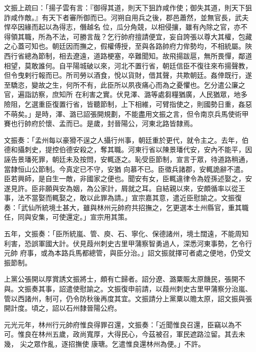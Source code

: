 \begin{pinyinscope}
 文振上疏曰：「揚子雲有言：『御得其道，則天下狙詐咸作使；御失其道，則天下狙詐咸作敵。』有天下者審所御而已。河朔自用兵之後，郡邑蕭然，並無官長，武夫悍卒因緣而起以為得志，僭越名
 位，瓜分角競，以相侵攘，雖有內除之官，亦不得領其職，所為不法，可勝言哉？乞行帥府擅請便宜，妄自誇張以尊大其權，包藏之心蓋可知也。朝廷因而撫之，假權傅授，至與各路帥府力侔勢均，不相統屬。陜西行省總為節制，相去遼遠，道路梗塞，卒難聞知。故飛揚跋扈，無所畏憚，鄰道相望，莫敢誰何。自平陽城破以來，河北不置行省，朝廷信臣不復往來布揚聲教，但令曳剌行報而已。所司勞以酒食，悅以貨財，借其聲，共欺朝廷。姦倖既行，遂至驕恣，變故之生，何所不有，此臣所以夙夜痛心而為之憂懼也。乞分遣公廉之官，遍詣訪察，庶知所
 在利害之實。伏見澤、潞等處芻糧猶廣，人民猶眾，地多險阻，乞選重臣復置行省，皆聽節制，上下相維，可臂指使之，則國勢日重，姦惡不萌矣。」是時，澤、潞已詔張開規劃，不能盡用文振之言，但令南京兵馬使術甲賽也行帥府於懷、孟而已。是歲，封晉陽公，河東北路皆隸焉。



 文振奏：「孟州每以豪猾不逞之人攝行州事，朝廷重於更代，就令主之。去年，伯德和攝刺史，提控伯德安殺之，奪其職。河東行省以陳景璠代安，安內不能平，因誣告景璠死罪，朝廷未及按問，安輒逐之。恥受臣節制，宣言于眾，待道路稍通，當隸恒山公節制。今真定已不守，安猶
 向慕不已。臣徵兵諸郡，安輒詭辭不遣。臣若興師，是自生一敵，非國家之便也。聞安有女，臣輒違律令為姪孫述娶之，安遂見許。臣非願與安為姻，為公家計，屑就之耳。自結親以來，安頗循率以從王事，法不當娶而輒娶之，敢以此罪為請。」宣宗嘉其意，遣近臣慰諭之。文振復奏：「武仙所統境土甚大，雖與林州元帥府共招撫之，乞更選本土州縣官，重其職任，同與安集，可使還定。」宣宗用其策。



 五年，文振奏：「臣所統嵐、管、庾、石、寧化、保德諸州，境土闊遠，不能周知利害，恐誤軍國大計。伏見葭州刺史古里甲蒲察智勇過人，深悉河東事勢，乞令行元帥
 府事，或為本路兵馬都總管，與臣分治。」詔文振就擇可者處之便地，仍受文振節制。



 上黨公張開以厚賞誘文振將士，頗有亡歸者。詔分遼、潞粟賑太原饑民，張開不與。文振奏其事，詔遣使慰諭之。文振復申前請，以葭州刺史古里甲蒲察分治嵐、管以西諸州，制可，仍令防秋後再度其宜。文振請分上黨粟以贍太原，詔文振與張開計度。頃之，詔以石州隸晉陽公府。


元光元年，林州行元帥府惟良得罪召還，文振奏：「近聞惟良召還，臣竊以為不可。惟良在林州五歲，政尚寬厚，大得民心，今茲被召，軍民遮路泣留。其去未幾，
 尖之眾作亂，逐招撫使
 康瑭。乞遣惟良還林州為便。」不許。




\end{pinyinscope}
